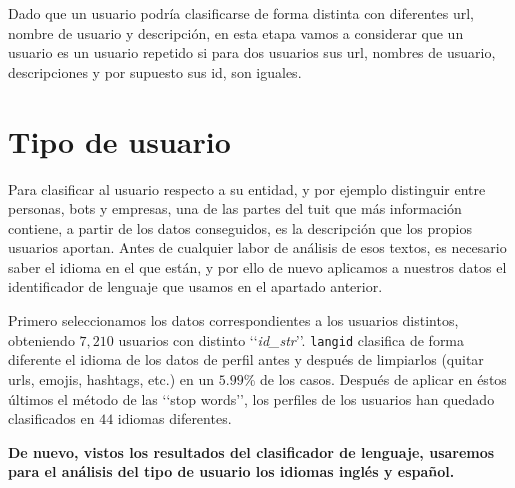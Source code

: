 Dado que un usuario podría clasificarse de forma distinta con diferentes url, nombre de usuario y 
descripción, en esta etapa vamos a considerar que un usuario es un usuario repetido si para dos 
usuarios sus url, nombres de usuario, descripciones y por supuesto sus id, son iguales.

\section{Tipo de usuario}
\label{sect:tipo_de_usuario}
Para clasificar al usuario respecto a su entidad, y por ejemplo distinguir entre personas, bots y empresas, 
una de las partes del tuit que más información contiene, a partir de los datos conseguidos, es
la descripción que los propios usuarios aportan. Antes de cualquier labor de análisis de esos textos,
es necesario saber el idioma en el que están, y por ello de nuevo aplicamos a nuestros datos 
el identificador de lenguaje que usamos en el apartado anterior. 

Primero seleccionamos los datos correspondientes a los usuarios distintos, obteniendo
$7,210$ usuarios con distinto \lq\lq{\em id\_str}\rq\rq. {\tt langid} clasifica de 
forma diferente el idioma de los datos de perfil antes y después de 
limpiarlos (quitar urls, emojis, hashtags, etc.) en un $5.99$\%
de los casos. Después de aplicar en éstos últimos el método de las \lq\lq stop words\rq\rq, 
los perfiles de los usuarios han quedado clasificados en $44$ idiomas diferentes.


{\bf De nuevo, vistos los resultados del clasificador de lenguaje, usaremos para el análisis del tipo 
de usuario los idiomas inglés y español.}

